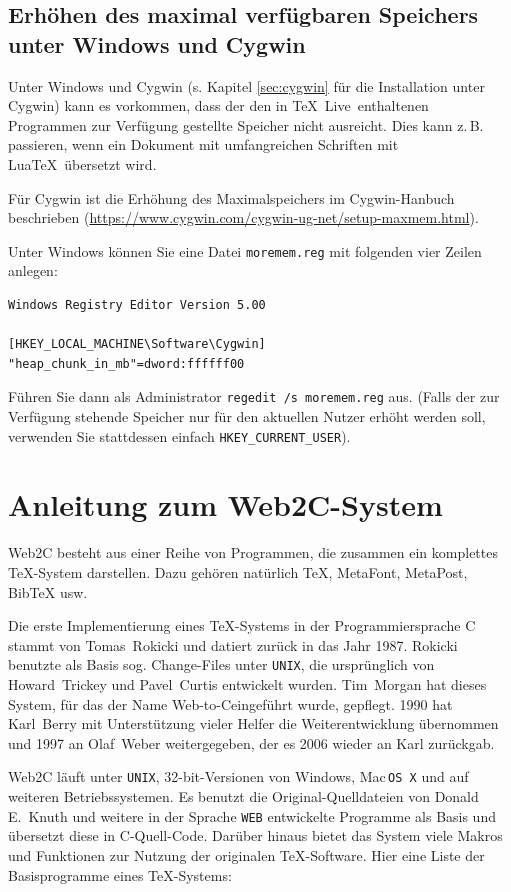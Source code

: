 \documentclass[12pt,ngerman,a4paper,fullparskip]{report}
\newcommand{\TL}{\TeX\ Live\xspace}
\newcommand{\acro}[1]{\texttt{#1}}
\newcommand{\code}[1]{\texttt{#1}}
\def\MP{MetaPost}
\def\MF{MetaFont}
\def\BibTeX{Bib\TeX}
\providecommand*{\MacOSX}{Mac\,\acro{OS\,X}\xspace}
\begin{document}
\section{Erhöhen des maximal verfügbaren Speichers unter Windows und Cygwin}
\label{sec:cygwin-maxmem}

Unter Windows und Cygwin (s. Kapitel \ref{sec:cygwin} für die Installation unter
Cygwin) kann es vorkommen, dass der den in \TL\ enthaltenen Programmen zur
Verfügung gestellte Speicher nicht ausreicht. Dies kann z.\,B. passieren, wenn 
ein Dokument mit umfangreichen Schriften mit Lua\TeX\ übersetzt wird.

Für Cygwin ist die Erhöhung des Maximalspeichers im Cygwin-Hanbuch beschrieben
(\url{https://www.cygwin.com/cygwin-ug-net/setup-maxmem.html}).

Unter Windows können Sie eine Datei \code{moremem.reg} mit folgenden vier
Zeilen anlegen:

\begin{verbatim}
Windows Registry Editor Version 5.00

[HKEY_LOCAL_MACHINE\Software\Cygwin]
"heap_chunk_in_mb"=dword:ffffff00
\end{verbatim}

Führen Sie dann als Administrator \code{regedit /s moremem.reg} aus.
(Falls der zur Verfügung stehende Speicher nur für den aktuellen Nutzer
erhöht werden soll, verwenden Sie stattdessen einfach \code{HKEY\_CURRENT\_USER}).

\chapter{Anleitung zum Web2C-System}

Web2C besteht aus einer Reihe von Programmen, die zusammen ein komplettes
\TeX-System darstellen. Dazu gehören natürlich \TeX, \MF, \MP, {\BibTeX} usw.

Die erste Implementierung eines \TeX-Systems in der Programmiersprache C stammt von Tomas~Rokicki und datiert zurück in das Jahr 1987. Rokicki benutzte als Basis sog. Change-Files unter \acro{UNIX}, die ursprünglich von Howard~Trickey und Pavel~Curtis entwickelt wurden. Tim~Morgan hat dieses System, für das der Name  Web-to-C\@ eingeführt wurde, gepflegt. 1990 hat Karl~Berry mit Unterstützung vieler Helfer die Weiterentwicklung übernommen und 1997 an Olaf~Weber weitergegeben, der es 2006 wieder an Karl zurückgab.

Web2C läuft unter \acro{UNIX}, 32-bit-Versionen von Windows, \MacOSX{}
und auf weiteren Betriebssystemen. Es benutzt die
Original-Quelldateien von Donald E.~Knuth und weitere in der
Sprache \texttt{WEB} entwickelte Programme als Basis und übersetzt diese
in C-Quell-Code. Darüber hinaus bietet das System viele Makros und
Funktionen zur Nutzung der originalen \TeX-Software. Hier eine
Liste der Basisprogramme eines \TeX-Systems:
\end{document}
